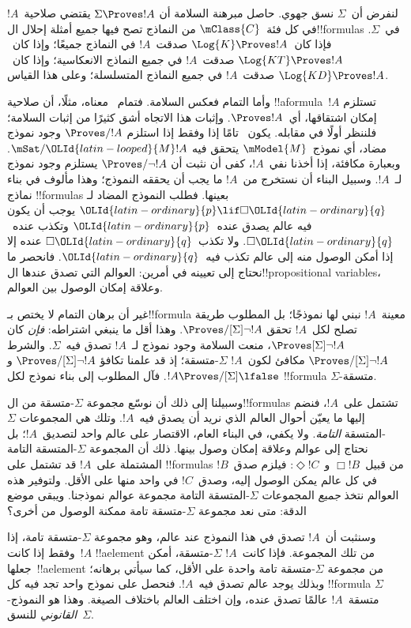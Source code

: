 \documentclass[../../../include/open-logic-section]{subfiles}
\begin{document}


لنفرض أن~$\Sigma$ نسق جهوي. حاصل مبرهنة السلامة أن
$\Sigma \Proves !A$ يقتضي صلاحية~$!A$ في كل فئة~$\mClass{C}$ من
النماذج تصح فيها جميع أمثلة إحلال ال!!{formula}s في~$\Sigma$.
فإذا كان~$\Log{K} \Proves !A$ صدقت~$!A$ في النماذج جميعًا؛
وإذا كان~$\Log{KT} \Proves !A$ صدقت~$!A$ في جميع النماذج الانعكاسية؛
وإذا كان~$\Log{KD} \Proves !A$ صدقت~$!A$ في جميع النماذج المتسلسلة؛
وعلى هذا القياس.

وأما التمام فعكس السلامة. فتمام~ معناه، مثلًا، أن صلاحية
!!a{formula}~$!A$ تستلزم إمكان اشتقاقها، أي~$\Proves !A$.
وإثبات هذا الاتجاه أشق كثيرًا من إثبات السلامة؛ فلننظر أولًا في مقابله.
يكون~ تامًا إذا وفقط إذا استلزم $\Proves/ !A$ وجود نموذج مضاد،
أي نموذج~$\mModel{M}$ يتحقق فيه $\mSat/{{\OLId{latin-looped}{M}}}{!A}$.
وبعبارة مكافئة، إذا أخذنا نفي~$!A$، كفى أن نثبت أن
$\Proves/ \lnot !A$ يستلزم وجود نموذج لـ~$!A$.
وسبيل البناء أن نستخرج من~$!A$ ما يجب أن يحققه النموذج؛ وهذا مألوف
في بناء نماذج !!{formula}s بعينها. فطلب النموذج المضاد لـ
${\OLId{latin-ordinary}{p}} \lif \Box {\OLId{latin-ordinary}{q}}$ يوجب أن يكون فيه عالم يصدق عنده~${\OLId{latin-ordinary}{p}}$ وتكذب عنده~$\Box {\OLId{latin-ordinary}{q}}$.
ولا تكذب~$\Box {\OLId{latin-ordinary}{q}}$ عنده إلا إذا أمكن الوصول منه إلى عالم تكذب فيه~${\OLId{latin-ordinary}{q}}$.
فانحصر ما نحتاج إلى تعيينه في أمرين: العوالم التي تصدق عندها
ال!!{propositional variable}s، وعلاقة إمكان الوصول بين العوالم.

غير أن برهان التمام لا يختص بـ!!{formula} معينة~$!A$ نبني لها نموذجًا؛
بل المطلوب طريقة تصلح لكل~$!A$ تحقق $\Proves/[\Sigma] \lnot !A$.
وهذا أقل ما ينبغي اشتراطه: \emph{فإن} كان $\Proves[\Sigma] \lnot !A$،
منعت السلامة وجود نموذج لـ~$!A$ تصدق فيه~$\Sigma$.
والشرط $\Proves/[\Sigma] \lnot !A$ مكافئ لكون~$!A$ $\Sigma$-متسقة؛
إذ قد علمنا تكافؤ $\Proves/[\Sigma] \lnot !A$ و
$!A \Proves/[\Sigma] \lfalse$.
فآل المطلوب إلى بناء نموذج لكل !!{formula} $\Sigma$-متسقة.

وسبيلنا إلى ذلك أن نوسّع مجموعة $\Sigma$-متسقة من
ال!!{formula}s تشتمل على~$!A$، فنضم إليها ما يعيّن أحوال العالم
الذي نريد أن يصدق فيه~$!A$. وتلك هي المجموعات
$\Sigma$-المتسقة \emph{التامة}.
ولا يكفي، في البناء العام، الاقتصار على
عالم واحد لتصديق~$!A$؛ بل نحتاج إلى عوالم وعلاقة إمكان وصول بينها.
ذلك أن المجموعة $\Sigma$-المتسقة التامة المشتملة على~$!A$ قد تشتمل
على !!{formula}s من قبيل~$\Box !B$ و~$\Diamond !C$:
فيلزم صدق~$!B$ في كل عالم يمكن الوصول إليه، وصدق~$!C$ في واحد منها
على الأقل. ولتوفير هذه العوالم نتخذ \emph{جميع} المجموعات
$\Sigma$-المتسقة التامة مجموعة عوالم نموذجنا.
ويبقى موضع الدقة: متى نعد مجموعة $\Sigma$-متسقة تامة
ممكنة الوصول من أخرى؟

وسنثبت أن~$!A$ تصدق في هذا النموذج عند عالم، وهو مجموعة
$\Sigma$-متسقة تامة، إذا وفقط إذا كانت~$!A$ !!a{element} من تلك المجموعة.
فإذا كانت~$!A$ $\Sigma$-متسقة، أمكن جعلها~!!a{element} من مجموعة
$\Sigma$-متسقة تامة واحدة على الأقل، كما سيأتي برهانه؛ وبذلك يوجد
عالم تصدق فيه~$!A$. فنحصل على نموذج واحد تجد فيه كل !!{formula}
$\Sigma$-متسقة~$!A$ عالمًا تصدق عنده، وإن اختلف العالم باختلاف الصيغة.
وهذا هو النموذج \emph{القانوني} للنسق~$\Sigma$.
\end{document}
